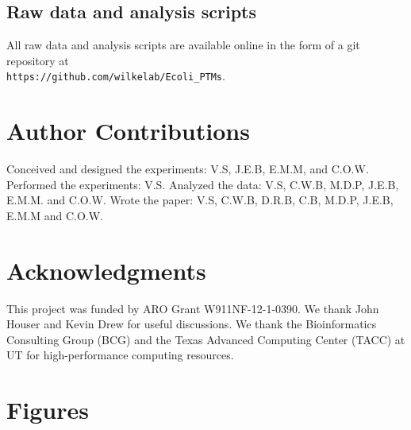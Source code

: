 \documentclass[12pt]{article}
\begin{document}
\subsection{Raw data and analysis scripts}

All raw data and analysis scripts are available online in the form of a git repository at\\ \texttt{https://github.com/wilkelab/Ecoli\_PTMs}.


\section{Author Contributions}
Conceived and designed the experiments: V.S, J.E.B, E.M.M, and C.O.W. Performed the experiments: V.S. Analyzed the data: V.S, C.W.B, M.D.P, J.E.B, E.M.M. and C.O.W. Wrote the paper: V.S, C.W.B, D.R.B, C.B, M.D.P, J.E.B, E.M.M and C.O.W.

\section{Acknowledgments}
This project was funded by ARO Grant W911NF-12-1-0390. We thank John Houser and Kevin Drew for useful discussions. We thank the Bioinformatics Consulting Group (BCG) and the Texas Advanced Computing Center (TACC) at UT for high-performance computing resources. 




\newpage

\section*{Figures}
\end{document}

